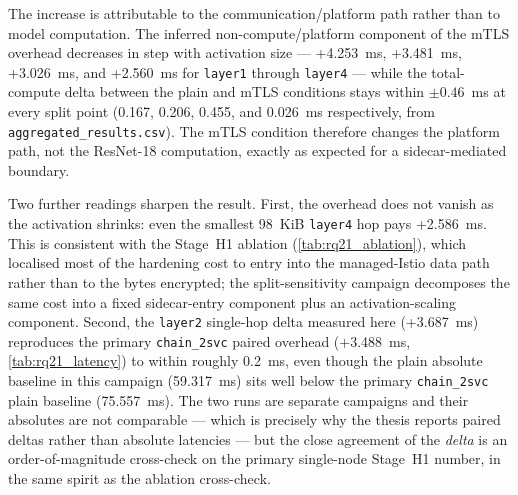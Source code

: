 The increase is attributable to the communication/platform path rather than to
model computation. The inferred non-compute/platform component of the mTLS
overhead decreases in step with activation size --- +4.253~ms, +3.481~ms,
+3.026~ms, and +2.560~ms for \texttt{layer1} through \texttt{layer4} --- while the
total-compute delta between the plain and mTLS conditions stays within
$\pm0.46$~ms at every split point (0.167, 0.206, 0.455, and 0.026~ms
respectively, from \texttt{aggregated\_results.csv}). The mTLS condition therefore
changes the platform path, not the ResNet-18 computation, exactly as expected for
a sidecar-mediated boundary.

Two further readings sharpen the result. First, the overhead does not vanish as
the activation shrinks: even the smallest 98~KiB \texttt{layer4} hop pays
+2.586~ms. This is consistent with the Stage~H1 ablation
(\cref{tab:rq21_ablation}), which localised most of the hardening cost to entry
into the managed-Istio data path rather than to the bytes encrypted; the
split-sensitivity campaign decomposes the same cost into a fixed sidecar-entry
component plus an activation-scaling component. Second, the \texttt{layer2}
single-hop delta measured here (+3.687~ms) reproduces the primary
\texttt{chain\_2svc} paired overhead (+3.488~ms, \cref{tab:rq21_latency}) to
within roughly 0.2~ms, even though the plain absolute baseline in this campaign
(59.317~ms) sits well below the primary \texttt{chain\_2svc} plain baseline
(75.557~ms). The two runs are separate campaigns and their absolutes are not
comparable --- which is precisely why the thesis reports paired deltas rather than
absolute latencies --- but the close agreement of the \emph{delta} is an
order-of-magnitude cross-check on the primary single-node Stage~H1 number, in the
same spirit as the ablation cross-check.

